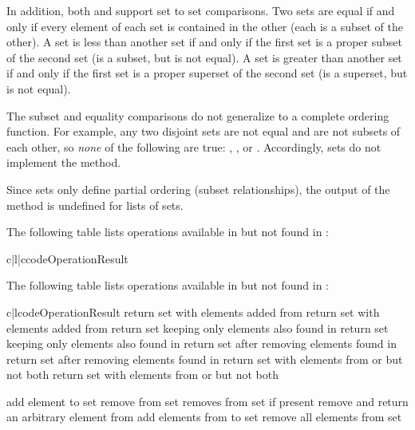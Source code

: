 In addition, both  and 
support set to set comparisons.  Two sets are equal if and only if
every element of each set is contained in the other (each is a subset
of the other).
A set is less than another set if and only if the first set is a proper
subset of the second set (is a subset, but is not equal).
A set is greater than another set if and only if the first set is a proper
superset of the second set (is a superset, but is not equal).

The subset and equality comparisons do not generalize to a complete
ordering function.  For example, any two disjoint sets are not equal and
are not subsets of each other, so \emph{none} of the following are true:
, , or .
Accordingly, sets do not implement the  method.

Since sets only define partial ordering (subset relationships), the output
of the  method is undefined for lists of sets.

The following table lists operations available in 
but not found in :

\begin{tableii}{c|l|c}{code}{Operation}{Result}
\end{tableii}

The following table lists operations available in 
but not found in :

\begin{tableii}{c|l}{code}{Operation}{Result}
         {return set  with elements added from }
         {return set  with elements added from }
         {return set  keeping only elements also found in }
         {return set  keeping only elements also found in }
         {return set  after removing elements found in }
         {return set  after removing elements found in }
         {return set  with elements from  or 
          but not both}
         {return set  with elements from  or 
          but not both}

  \hline
         {add element  to set }
         {remove  from set }
         {removes  from set  if present}
         {remove and return an arbitrary element from }
         {add elements from  to set }
         {remove all elements from set }
\end{tableii}


